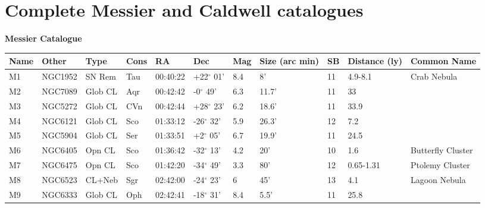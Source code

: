 \documentclass[10pt,twoside,a4paper,english]{article}
\begin{document}
\section{Complete Messier and Caldwell catalogues} 
\vspace{4 mm} 
\hspace{4 mm} 
{\bf Messier Catalogue} 
\begin{longtable}{@{}lllllllllll@{}} 
\hline 
{\bf Name} & {\bf Other} & {\bf Type} & {\bf Cons} & {\bf RA}  & {\bf Dec} & {\bf Mag} & {\bf Size (arc min)} & {\bf SB} & {\bf Distance (ly)} & {\bf Common Name}               \\ 
\hline 
M1         & NGC1952     & SN Rem     & Tau       & 00:40:22 & +22$^{\circ}$ 01'  & 8.4       & 8'                   & 11       & 4.9-8.1             & Crab Nebula                               \\ 
M2         & NGC7089     & Glob CL    & Aqr       & 00:42:42 & -0$^{\circ}$ 49'   & 6.3       & 11.7'                & 11       & 33                  &                                           \\ 
M3         & NGC5272     & Glob CL    & CVn       & 00:42:44 & +28$^{\circ}$ 23'  & 6.2       & 18.6'                & 11       & 33.9                &                                           \\ 
M4         & NGC6121     & Glob CL    & Sco       & 01:33:12 & -26$^{\circ}$ 32'  & 5.9       & 26.3'                & 12       & 7.2                 &                                           \\ 
M5         & NGC5904     & Glob CL    & Ser       & 01:33:51 & +2$^{\circ}$ 05'   & 6.7       & 19.9'                & 11       & 24.5                &                                           \\ 
M6         & NGC6405     & Opn CL     & Sco       & 01:36:42 & -32$^{\circ}$ 13'  & 4.2       & 20'                  & 10       & 1.6                 & Butterfly Cluster                         \\ 
M7         & NGC6475     & Opn CL     & Sco       & 01:42:20 & -34$^{\circ}$ 49'  & 3.3       & 80'                  & 12       & 0.65-1.31           & Ptolemy Cluster                           \\ 
M8         & NGC6523     & CL+Neb     & Sgr       & 02:42:00 & -24$^{\circ}$ 23'  & 6         & 45'                  & 13       & 4.1                 & Lagoon Nebula                             \\ 
M9         & NGC6333     & Glob CL    & Oph       & 02:42:41 & -18$^{\circ}$ 31'  & 8.4       & 5.5'                 & 11       & 25.8                &                                           \\ 

\end{longtable}
\end{document}
